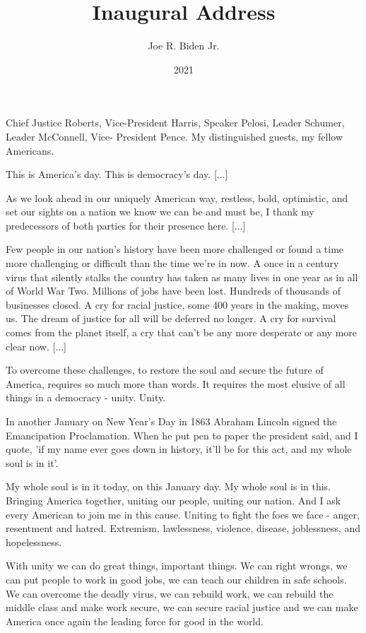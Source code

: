 \documentclass[10pt,a4paper]{article}
\begin{document}
\title{Inaugural Address}
\date{2021}
\author{Joe R. Biden Jr.}
\maketitle
    
\thispagestyle{plain}
\setcounter{page}{1}
\linenumbers
\noindent Chief Justice Roberts, Vice-President Harris, Speaker Pelosi, Leader Schumer, Leader McConnell, Vice-
President Pence. My distinguished guests, my fellow Americans.

This is America's day. This is democracy's day. [...]

As we look ahead in our uniquely American way, restless, bold, optimistic, and set our sights on a nation we know we can be and must be, I thank my predecessors of both parties for their presence here. [...]

Few people in our nation's history have been more challenged or found a time more challenging or difficult than the time we're in now. A once in a century virus that silently stalks the country has taken as many lives in one year as in all of World War Two. Millions of jobs have been lost. Hundreds of thousands of businesses closed. A cry for racial justice, some 400 years in the making, moves us. The dream of justice for all will be deferred no longer. A cry for survival comes from the planet itself, a cry that can't be any more desperate or any more clear now. [...]

To overcome these challenges, to restore the soul and secure the future of America, requires so much more than words. It requires the most elusive of all things in a democracy - unity. Unity.

In another January on New Year's Day in 1863 Abraham Lincoln signed the Emancipation Proclamation. When he put pen to paper the president said, and I quote, 'if my name ever goes down in history, it'll be for this act, and my whole soul is in it'.

My whole soul is in it today, on this January day. My whole soul is in this. Bringing America together, uniting our people, uniting our nation. And I ask every American to join me in this cause. Uniting to fight the foes we face - anger, resentment and hatred. Extremism, lawlessness, violence, disease, joblessness, and hopelessness.

With unity we can do great things, important things. We can right wrongs, we can put people to work in good jobs, we can teach our children in safe schools. We can overcome the deadly virus, we can rebuild work, we can rebuild the middle class and make work secure, we can secure racial justice and we can make America once again the leading force for good in the world.
\end{document}
